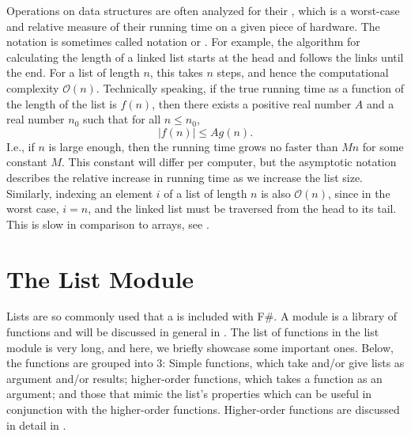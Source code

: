 \documentclass[fsharpNotes.tex]{subfiles}
\begin{document}
Operations on data structures are often analyzed for their , which is a worst-case and relative measure of their running time on a given piece of hardware. The notation is sometimes called  notation or . For example, the algorithm for calculating the length of a linked list starts at the head and follows the links until the end. For a list of length $n$, this takes $n$ steps, and hence the computational complexity $\mathcal{O}(n)$. Technically speaking, if the true running time as a function of the length of the list is $f(n)$, then there exists a positive real number $A$ and a real number $n_0$ such that for all $n\leq n_0$,
\begin{equation}
  |f(n)| \leq Ag(n).
\end{equation}
I.e., if $n$ is large enough, then the running time grows no faster than $Mn$ for some constant $M$. This constant will differ per computer, but the asymptotic notation describes the relative increase in running time as we increase the list size. Similarly, indexing an element $i$ of a list of length $n$ is also $\mathcal{O}(n)$, since in the worst case, $i=n$, and the linked list must be traversed from the head to its tail. This is slow in comparison to arrays, see .
 
\section{The List Module}
Lists are so commonly used that a  is included with F\#. A module is a library of functions and will be discussed in general in . The list of functions in the list module is very long, and here, we briefly showcase some important ones. Below, the functions are grouped into 3: Simple functions, which take and/or give lists as argument and/or results; higher-order functions, which takes a function as an argument; and those that mimic the list's properties which can be useful in conjunction with the higher-order functions. Higher-order functions are discussed in detail in .
\end{document}
